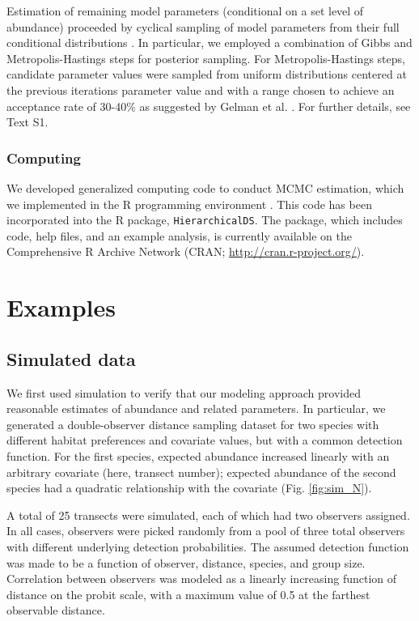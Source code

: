 \documentclass[10pt]{article}
\begin{document}
Estimation of remaining model parameters (conditional on a set level of abundance)  proceeded by cyclical sampling of model parameters from their full conditional distributions \cite{GelmanEtAl2004}.  In particular, we employed a combination of Gibbs and Metropolis-Hastings steps for posterior sampling.  For Metropolis-Hastings steps, candidate parameter values were sampled from uniform distributions centered at the previous iterations parameter value and with a range chosen to achieve an acceptance rate of 30-40\% as suggested by Gelman et al. \cite{GelmanEtAl2004}.  For further details, see Text S1.

\subsubsection*{Computing}

We developed generalized computing code to conduct MCMC estimation, which we implemented in the R programming environment \cite{RTeam2007}.  This code has been incorporated into the R package, {\tt HierarchicalDS}.  The package, which includes code, help files, and an example analysis, is currently available on the Comprehensive R Archive Network (CRAN; \url{http://cran.r-project.org/}).


\section*{Examples}

\subsection*{Simulated data}

We first used simulation to verify that our modeling approach provided reasonable estimates of abundance and related parameters.  In particular, we generated a double-observer distance sampling dataset for two species with different habitat preferences and covariate values, but with a common detection function.  For the first species, expected abundance increased linearly with an arbitrary covariate (here, transect number); expected abundance of the second species had a quadratic relationship with the covariate (Fig. \ref{fig:sim_N}).

A total of 25 transects were simulated, each of which had two observers assigned.
In all cases, observers were picked randomly from a pool of three total observers with different underlying detection probabilities.  The assumed detection function was made to be a function of observer, distance, species, and group size.  Correlation between observers was modeled as a linearly increasing function of distance on the probit scale, with a maximum value of 0.5 at the farthest observable distance.
\end{document}
